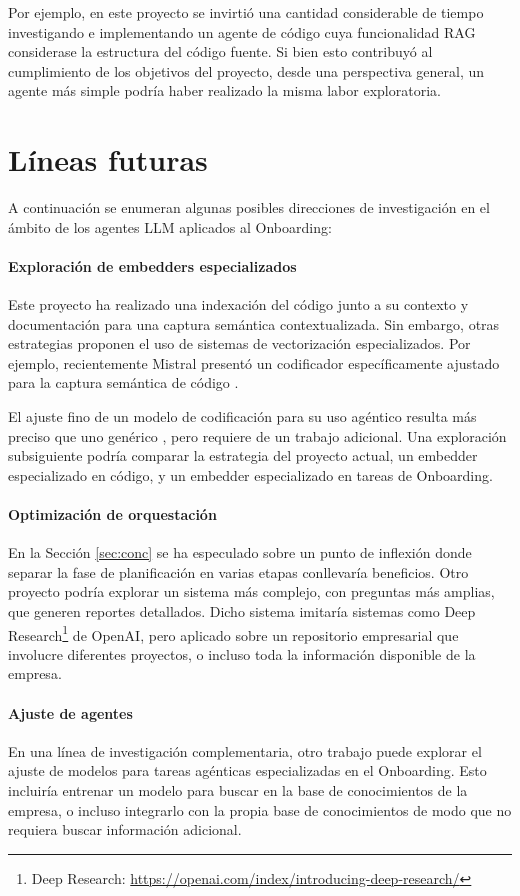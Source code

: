 Por ejemplo, en este proyecto se invirtió una cantidad considerable de tiempo investigando e implementando un agente de código cuya funcionalidad RAG considerase la estructura del código fuente. Si bien esto contribuyó al cumplimiento de los objetivos del proyecto, desde una perspectiva general, un agente más simple podría haber realizado la misma labor exploratoria.

\section{Líneas futuras}
A continuación se enumeran algunas posibles direcciones de investigación en el ámbito de los agentes LLM aplicados al Onboarding:
\paragraph{Exploración de embedders especializados} Este proyecto ha realizado una indexación del código junto a su contexto y documentación para una captura semántica contextualizada. Sin embargo, otras estrategias proponen el uso de sistemas de vectorización especializados. Por ejemplo, recientemente Mistral presentó un codificador específicamente ajustado para la captura semántica de código \cite{noauthor_codestral_nodate}.

El ajuste fino de un modelo de codificación para su uso agéntico resulta más preciso que uno genérico \cite{khattab_relevance-guided_2021,xiong_approximate_2020,yu_augmentation-adapted_2023}, pero requiere de un trabajo adicional. Una exploración subsiguiente podría comparar la estrategia del proyecto actual, un embedder especializado en código, y un embedder especializado en tareas de Onboarding.

\paragraph{Optimización de orquestación} En la Sección \ref{sec:conc} se ha especulado sobre un punto de inflexión donde separar la fase de planificación en varias etapas conllevaría beneficios. Otro proyecto podría explorar un sistema más complejo, con preguntas más amplias, que generen reportes detallados. Dicho sistema imitaría sistemas como Deep Research\footnote{Deep Research: \url{https://openai.com/index/introducing-deep-research/}} de OpenAI, pero aplicado sobre un repositorio empresarial que involucre diferentes proyectos, o incluso toda la información disponible de la empresa.

\paragraph{Ajuste de agentes} En una línea de investigación complementaria, otro trabajo puede explorar el ajuste de modelos para tareas agénticas especializadas en el Onboarding. Esto incluiría entrenar un modelo para buscar en la base de conocimientos de la empresa, o incluso integrarlo con la propia base de conocimientos de modo que no requiera buscar información adicional.
